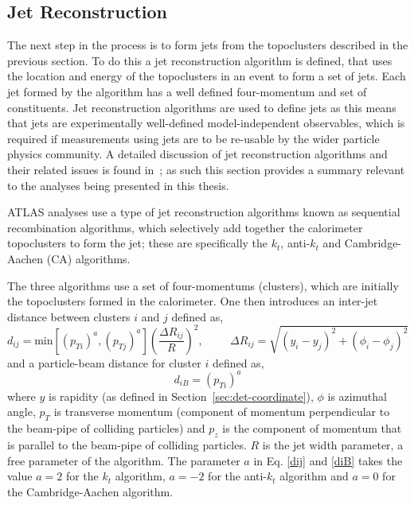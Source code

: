 \FloatBarrier
\subsection{Jet Reconstruction}
\label{sec:obj-jets_reco}

The next step in the process is to form jets from the topoclusters described in the previous section.
To do this a jet reconstruction algorithm is defined,
that uses the location and energy of the topoclusters in an event to form a set of jets.
Each jet formed by the algorithm has a well defined four-momentum and set of constituents.
Jet reconstruction algorithms are used to define jets as this means that jets are experimentally well-defined model-independent observables,
which is required if measurements using jets are to be re-usable by the wider particle physics community.
A detailed discussion of jet reconstruction algorithms
and their related issues is found in~\cite{obj-jets_reco_salam};
as such this section provides a summary relevant to the analyses being presented in this thesis.

ATLAS analyses use a type of jet reconstruction algorithms known as sequential recombination algorithms,
which selectively add together the calorimeter topoclusters to form the jet;
these are specifically the $k_t$, anti-$k_t$ and Cambridge-Aachen (CA) algorithms.

The three algorithms use a set of four-momentums (clusters), which are initially the topoclusters formed in the calorimeter.
One then introduces an inter-jet distance between clusters $i$ and $j$ defined as,
\begin{equation}
  d_{ij} = \text{min}
  [(p_{ Ti})^a, (p_{ Tj})^a]  \left(\frac{\Delta  R_{ij}}{R}\right) ^2, \hspace{1cm} \Delta R_{ij} = \sqrt{(y_{i} - y_{j})^2 + (\phi_{i} - \phi_{j})^2} \label{dij}
\end{equation}
\noindent and a particle-beam distance for cluster $i$ defined as,
\begin{equation}
  d_{iB} = (p_{Ti})^a \label{diB}
\end{equation}
where $y$  is rapidity (as defined in Section~\ref{sec:det-coordinate}), $\phi$ is azimuthal angle,
$p_T$ is transverse momentum (component of momentum perpendicular to the beam-pipe of colliding particles)
and $p_z$ is the component of momentum that is parallel to the beam-pipe of colliding particles.
$R$ is the jet width parameter, a free parameter of the algorithm.
The parameter $a$ in Eq. \eqref{dij} and \eqref{diB} takes the value $a = 2$ for the $k_t$ algorithm, $a = -2$ for the anti-$k_t$ algorithm 
and  $a = 0$ for the Cambridge-Aachen algorithm.

